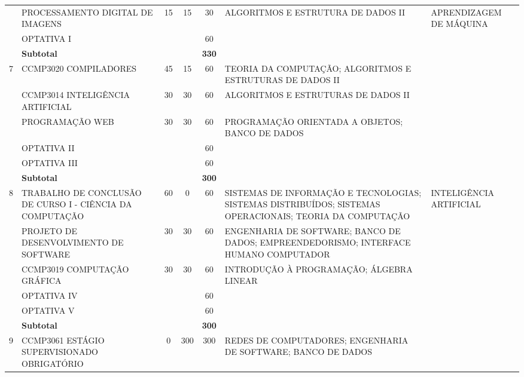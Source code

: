 \begin{center}
\begin{tiny}
\begin{longtable}{cp{4.5cm}cccp{2.8cm}p{2.8cm}}
      & PROCESSAMENTO DIGITAL DE IMAGENS & 15 & 15 & 30 & ALGORITMOS E ESTRUTURA DE DADOS II & APRENDIZAGEM DE MÁQUINA \\ \cline{2-7}
      & OPTATIVA I & & & 60 & & \\ \midrule
      & \multicolumn{3}{l}{\textbf{Subtotal}} & \textbf{330} & & \\ \midrule
    7 & CCMP3020 COMPILADORES & 45 & 15 & 60 & TEORIA DA COMPUTAÇÃO; \newline ALGORITMOS E ESTRUTURAS DE DADOS II & \\ \cline{2-7}
      & CCMP3014 INTELIGÊNCIA ARTIFICIAL & 30 & 30 & 60 & ALGORITMOS E ESTRUTURAS DE DADOS II & \\ \cline{2-7}
      & PROGRAMAÇÃO WEB & 30 & 30 & 60 & PROGRAMAÇÃO ORIENTADA A OBJETOS; \newline BANCO DE DADOS & \\ \cline{2-7}
      & OPTATIVA II & & & 60 & & \\ \cline{2-7}
      & OPTATIVA III & & & 60 & & \\ \midrule
      & \multicolumn{3}{l}{\textbf{Subtotal}} & \textbf{300} & & \\ \midrule
    8 & TRABALHO DE CONCLUSÃO DE CURSO I - CIÊNCIA DA COMPUTAÇÃO & 60 & 0 & 60 & SISTEMAS DE INFORMAÇÃO E TECNOLOGIAS; \newline SISTEMAS DISTRIBUÍDOS; \newline SISTEMAS OPERACIONAIS; \newline TEORIA DA COMPUTAÇÃO & INTELIGÊNCIA ARTIFICIAL \\ \cline{2-7}
      & PROJETO DE DESENVOLVIMENTO DE SOFTWARE & 30 & 30 & 60 & ENGENHARIA DE SOFTWARE; \newline BANCO DE DADOS; \newline EMPREENDEDORISMO; \newline INTERFACE HUMANO COMPUTADOR & \\ \cline{2-7}
      & CCMP3019 COMPUTAÇÃO GRÁFICA & 30 & 30 & 60 & INTRODUÇÃO À PROGRAMAÇÃO; \newline ÁLGEBRA LINEAR & \\ \cline{2-7}
      & OPTATIVA IV & & & 60 & & \\ \cline{2-7}
      & OPTATIVA V & & & 60 & & \\ \midrule
      & \multicolumn{3}{l}{\textbf{Subtotal}} & \textbf{300} & & \\ \midrule
    9 & CCMP3061 ESTÁGIO SUPERVISIONADO OBRIGATÓRIO & 0 & 300 & 300 & REDES DE COMPUTADORES; \newline ENGENHARIA DE SOFTWARE; \newline BANCO DE DADOS & \\ \cline{2-7}

\end{longtable}
\end{tiny}
\end{center}
